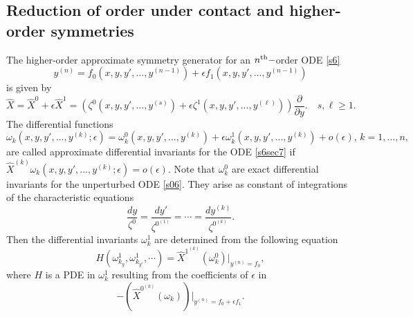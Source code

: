 \documentclass[11pt,letter,subeqn]{article}
\begin{document}
\subsection{Reduction of order under contact and higher-order symmetries}
 The higher-order approximate symmetry generator for an $n^{\rm th}-$order ODE \eqref{s6}
 \begin{equation}\label{s6sec7}
    y^{(n)}=f_0(x,y,y',...,y^{(n-1)})+\epsilon f_1(x,y,y',...,y^{(n-1)})
  \end{equation}
is given by
\begin{equation}\label{}
  \hat{X}=\hat{ X}^0+\epsilon \hat{X}^1=\left(\zeta^0(x,y,y',...,y^{(s)})+\epsilon \zeta^1(x,y,y',...,y^{(\ell)})\right)\dfrac{\partial}{\partial y}.\quad s,\ell\geq 1.
\end{equation}
The differential functions
   \[
     \omega_k(x,y,y',...,y^{(k)};\epsilon)=\omega_k^0(x,y,y',...,y^{(k)})+\epsilon \omega_k^1(x,y,y',...,y^{(k)})+o(\epsilon),\, k=1,...,n,
   \]
   are called approximate differential invariants for the ODE \eqref{s6sec7} if ${\hat{X}}^{(k)}\omega_k(x,y,y',...,y^{(k)};\epsilon)=o(\epsilon).$ Note that $\omega_k^0$ are exact differential invariants for the unperturbed ODE \eqref{s06}. They arise as constant of integrations of the characteristic equations
   \begin{equation}\label{IF31}
     \dfrac{dy}{\zeta^0}=\dfrac{dy'}{\zeta^{0^{(1)}}}=\cdots=\dfrac{dy^{(k)}}{\zeta^{0^{(k)}}}.
   \end{equation}
   Then the differential invariants $\omega_k^1$ are determined from the following equation
   \[
     H(\omega_{k_y}^1,\omega_{k_{y'}}^1,\cdots)=\hat{X}^{1^{(k)}}(\omega_k^0)\bigg|_{y^{(n)}=f_0},
   \]
    where $H$ is a PDE in $\omega_{k}^1$ resulting from the coefficients of $\epsilon$ in
   \[
     -\left(\hat{X}^{0^{(k)}}(\omega_k)\right)\bigg|_{y^{(n)}=f_0+\epsilon f_1}.
   \]
\end{document}

